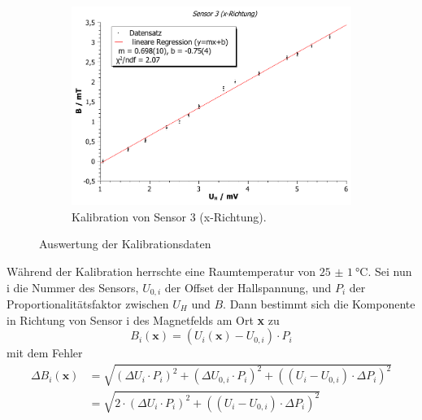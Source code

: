 \documentclass[12pt,a4paper]{article}
\begin{document}
\begin{figure}
\begin{subfigure}[c]{0.7\textwidth}
		\includegraphics[scale=0.7]{sensor3.pdf}
		\caption{Kalibration von Sensor 3 (x-Richtung).}
		\label{kalib_plot_c}
	\end{subfigure}
	\caption{Auswertung der Kalibrationsdaten}
	\label{fig:kalib_plot}
\end{figure}
Während der Kalibration herrschte eine Raumtemperatur von $\SI{25(1)}{\celsius}$. Sei nun i die Nummer des Sensors, $U_{0,i}$ der Offset der Hallspannung, und $P_i$ der Proportionalitätsfaktor zwischen $U_H$ und $B$. Dann bestimmt sich die Komponente in Richtung von Sensor i des Magnetfelds am Ort \textbf{x} zu
\begin{equation}
	B_i(\textbf{x})=(U_i(\textbf{x})-U_{0,i})\cdot P_i
	\label{eq:B}
\end{equation}
mit dem Fehler
\begin{align}
	\nonumber \Delta B_i(\textbf{x}) &= \sqrt{(\Delta U_i \cdot P_i)^2+(\Delta U_{0,i}\cdot P_i)^2+((U_i-U_{0, i})\cdot \Delta P_i)^2}\\
	 &= \sqrt{2\cdot (\Delta U_i \cdot P_i)^2+((U_i-U_{0, i})\cdot \Delta P_i)^2}
\end{align}
\end{document}
